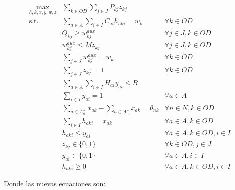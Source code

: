 \begin{align}
  \max_{h,k,x,y,w,z} & \sum_{k \in OD} \sum_{j \in J} P_{kj} z_{kj}                          & \label{eq:objectivefinalalt} \\
  \text{s.t.}\; & \sum_{a \in A} \sum_{i \in I} C_{ai}h_{aki} = w_k                     & \forall k \in OD \label{eq:shortestpathaltfinal} \\
                & Q_{kj} \geq w^{aux}_{kj}                                              & \forall j \in J, k \in OD \label{eq:breakpointsalt} \\
                & w^{aux}_{kj} \leq M z_{kj}                                            & \forall j \in J, k \in OD \\
                & \sum_{j \in J} w^{aux}_{kj} = w_k                                     & \forall k \in OD \\
                & \sum_{j \in J} z_{kj} = 1                                             & \forall k \in OD \label{eq:singularbreakpointalt} \\
                & \sum_{a \in A} \sum_{i \in I} H_{ai}y_{ai} \leq B                     & \label{eq:respectbudgetaltfinal} \\
                & \sum_{i \in I} y_{ai} = 1                                             & \forall a \in A \label{eq:alwaysoneyaltfinal} \\
                & \sum_{a \in A_n^+} x_{ak} - \sum_{a \in A_n^-} x_{ak} = \theta_{nk}   & \forall n \in N, k \in OD \label{eq:flowbalancealtfinal} \\
                & \sum_{i \in I} h_{aki} = x_{ak}                                       & \forall a \in A, k \in OD \label{eq:flowactivationalt} \\
                & h_{aki} \leq y_{ai}                                                   & \forall a \in A, k \in OD, i \in I \label{eq:respectinfraalt} \\
                & z_{kj} \in \{0,1\}                                                    & \forall k \in OD, j \in J \nonumber \\
                & y_{ai} \in \{0,1\}                                                    & \forall a \in A, i \in I \nonumber \\
                & h_{aki} \geq 0                                                        & \forall a \in A, k \in OD, i \in I \nonumber
\end{align}

Donde las nuevas ecuaciones son:

